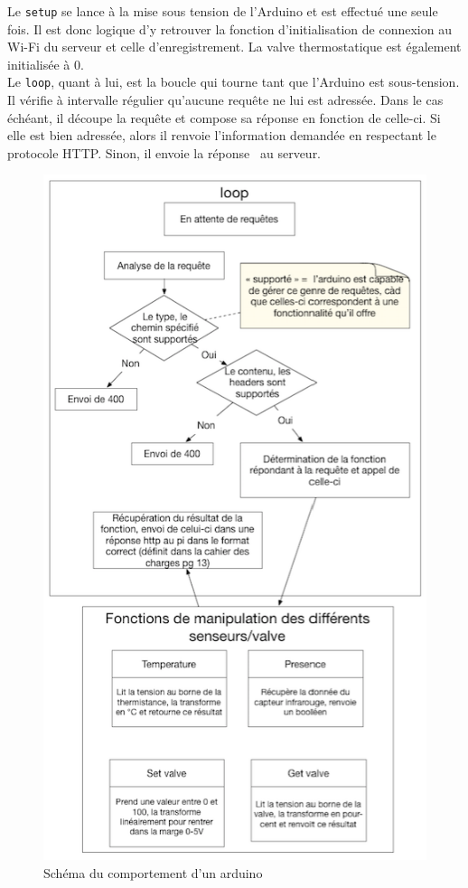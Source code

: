 \documentclass[11pt,a4paper,11pt]{report}
\begin{document}
Le \texttt{setup} se lance à la mise sous tension de l'Arduino et est effectué une seule fois. Il est donc logique d'y retrouver la fonction d'initialisation de connexion au Wi-Fi du serveur et celle d'enregistrement. La valve thermostatique est également initialisée à 0.\\

Le \texttt{loop}, quant à lui, est la boucle qui tourne tant que l'Arduino est sous-tension. Il vérifie à intervalle régulier qu'aucune requête ne lui est adressée. Dans le cas échéant, il découpe la requête et compose sa réponse en fonction de celle-ci. Si elle est bien adressée, alors il renvoie l'information demandée en respectant le protocole HTTP. Sinon, il envoie la réponse  \fg ~au serveur.\\

\begin{figure}[h]
 \begin{center}
  \includegraphics[width=0.63\linewidth]{images/loop_behav_dia.png}
  \caption{Schéma du comportement d'un arduino}
  \label{loop_behav_dia}
 \end{center}
\end{figure}
\end{document}
